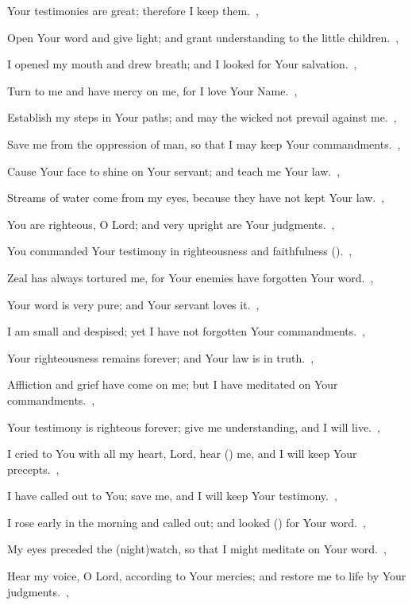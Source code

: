 \documentclass[12pt,twoside,a5paper]{article}
\begin{document}
\begin{halfparskip}
   Your testimonies are great; therefore I keep them.~\sep

  Open Your word and give light; and grant understanding to the little children.~\sep

  I opened my mouth and drew breath; and I looked for Your salvation.~\sep

  Turn to me and have mercy on me, for I love Your Name.~\sep

  Establish my steps in Your paths; and may the wicked not prevail against me.~\sep

  Save me from the oppression of man, so that I may keep Your commandments.~\sep

  Cause Your face to shine on Your servant; and teach me Your law.~\sep

  Streams of water come from my eyes, because they have not kept Your law.~\sep

   You are righteous, O Lord; and very upright are Your judgments.~\sep

  You commanded Your testimony in righteousness and faithfulness ().~\sep

  Zeal has always tortured me, for Your enemies have forgotten Your word.~\sep

  Your word is very pure; and Your servant loves it.~\sep

  I am small and despised; yet I have not forgotten Your commandments.~\sep

  Your righteousness remains forever; and Your law is in truth.~\sep

  Affliction and grief have come on me; but I have meditated on Your commandments.~\sep

  Your testimony is righteous forever; give me understanding, and I will live.~\sep

   I cried to You with all my heart, Lord, hear () me, and I will keep Your precepts.~\sep

  I have called out to You; save me, and I will keep Your testimony.~\sep

  I rose early in the morning and called out; and looked () for Your word.~\sep

  My eyes preceded the (night)watch, so that I might meditate on Your word.~\sep

  Hear my voice, O Lord, according to Your mercies; and restore me to life by Your judgments.~\sep


\end{halfparskip}
\end{document}
